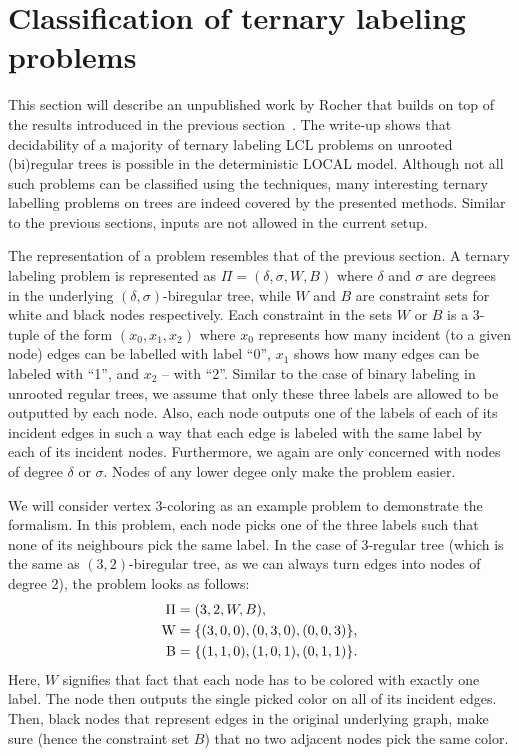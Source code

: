 \section{Classification of ternary labeling problems}

This section will describe an unpublished work by Rocher that builds on top
of the results introduced in the previous section~\cite{Rocher2020doc, Rocher2020clas}.
The write-up shows that decidability of a majority of ternary labeling LCL problems on unrooted
(bi)regular trees is possible in the deterministic LOCAL model. Although not all such problems
can be classified using the techniques, many interesting ternary labelling problems on trees
are indeed covered by the presented methods.
Similar to the previous sections, inputs are not allowed in the current setup.

The representation of a problem resembles that of the previous section. A
ternary labeling problem is represented as $\Pi = (\delta, \sigma, W, B)$
where $\delta$ and $\sigma$ are degrees in the underlying $(\delta, \sigma)$-biregular
tree, while $W$ and $B$ are constraint sets for white and black nodes respectively.
Each constraint in the sets $W$ or $B$ is a 3-tuple of the form $(x_0, x_1, x_2)$
where $x_0$ represents how many incident (to a given node) edges can be labelled with label ``0'',
$x_1$ shows how many edges can be labeled with ``1'', and $x_2$ -- with ``2''. Similar to the case
of binary labeling in unrooted regular trees, we assume that only these three labels are allowed to
be outputted by each node. Also, each node outputs one of the labels of each of its incident edges
in such a way that each edge is labeled with the same label by each of its incident nodes.
Furthermore, we again are only concerned with nodes of degree $\delta$ or $\sigma$. Nodes of
any lower degee only make the problem easier.

We will consider vertex 3-coloring as an example problem to demonstrate the formalism.
In this problem, each node picks one of the three labels such that none of its neighbours
pick the same label. In the case of 3-regular tree (which is the same as $(3, 2)$-biregular tree,
as we can always turn edges into nodes of degree 2), the problem looks as follows:
\begin{align*}
  \Pi &= (3, 2, W, B), \\
  \operatorname{W} &= \{ (3, 0, 0), (0, 3, 0), (0, 0, 3) \}, \\
  \operatorname{B} &= \{ (1, 1, 0), (1, 0, 1), (0, 1, 1) \}.
\end{align*}
Here, $W$ signifies that fact that each node has to be colored with exactly one label. The node then outputs
the single picked color on all of its incident edges. Then, black nodes that represent edges in the
original underlying graph, make sure (hence the constraint set $B$) that no two adjacent nodes
pick the same color.

